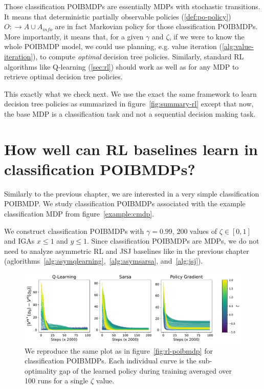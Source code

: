 Those classification POIBMDPs are essentially MDPs with stochastic transitions.
It means that deterministic partially observable policies (\ref{def:po-policy}) $O:\rightarrow A\cup A_{info}$ are in fact Markovian policy for those classification POIBMDPs.
More importantly, it means that, for a given $\gamma$ and $\zeta$, if we were to know the whole POIBMDP model, we could use planning, e.g. value iteration (\ref{alg:value-iteration}), to compute \textit{optimal} decision tree policies.
Similarly, standard RL algorithms like Q-learning (\ref{sec:rl}) should work as well as for any MDP to retrieve optimal decision tree policies.

This exactly what we check next.
We use the exact the same framework to learn decision tree policies as summarized in figure~\ref{fig:summary-rl} except that now, the base MDP is a classification task and not a sequential decision making task.

\section{How well can RL baselines learn in classification POIBMDPs?}
Similarly to the previous chapter, we are interested in a very simple classification POIBMDP.
We study classification POIBMDPs associated with the example classification MDP from figure~\ref{example:cmdp}.

We construct classification POIBMDPs with $\gamma=0.99$, 200 values of $\zeta \in [0,1]$ and IGAs $x\leq 1$ and $y\leq 1$.
Since classification POIBMDPs are MDPs, we do not need to analyze asymmetric RL and JSJ baselines like in the previous chapter (aglorithms~\ref{alg:asymqlearning},~\ref{alg:asymsarsa}, and~\ref{alg:jsj}).

\begin{figure}
    \centering
    \includegraphics[width=1\textwidth]{images/images_part1/learning_curves_classif.pdf}
    \caption{We reproduce the same plot as in figure~\ref{fig:rl-poibmdp} for classification POIBMDPs. Each individual curve is the sub-optimality gap of the learned policy during training averaged over 100 runs for a single $\zeta$ value.}\label{fig:rl-classif-poibmdp}
\end{figure}


